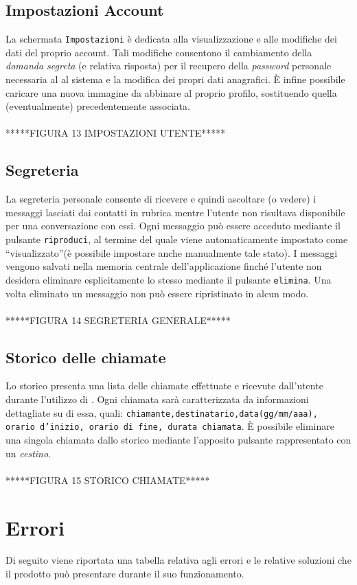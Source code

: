 \subsection{Impostazioni Account}
La schermata \texttt{Impostazioni} è dedicata alla visualizzazione e alle modifiche dei dati del proprio account. Tali modifiche consentono il cambiamento della \textit{domanda segreta} (e relativa risposta) per il recupero della \textit{password} personale necessaria al \underline{} al sistema e la modifica dei propri dati anagrafici.
È infine possibile caricare una nuova immagine da abbinare al proprio profilo, sostituendo quella (eventualmente) precedentemente associata.
\\\\*****FIGURA 13 IMPOSTAZIONI UTENTE*****
 
\subsection{Segreteria}
La segreteria personale consente di ricevere e quindi ascoltare (o vedere) i messaggi lasciati dai contatti in rubrica mentre l'utente non risultava disponibile per una conversazione con essi.
Ogni messaggio può essere acceduto mediante il pulsante \texttt{riproduci}, al termine del quale viene automaticamente impostato come ``visualizzato''(è possibile impostare anche manualmente tale stato).
I messaggi vengono salvati nella memoria centrale dell'applicazione \caName{} finché l'utente non desidera eliminare esplicitamente lo stesso mediante il pulsante \texttt{elimina}. Una volta eliminato un messaggio non può essere ripristinato in alcun modo.
\\\\*****FIGURA 14 SEGRETERIA GENERALE*****

\subsection{Storico delle chiamate}
Lo storico presenta una lista delle chiamate effettuate e ricevute dall'utente durante l'utilizzo di \caName{}. Ogni chiamata sarà caratterizzata da informazioni dettagliate su di essa, quali: \texttt{chiamante,destinatario,data(gg/mm/aaa), orario d'inizio, orario di fine, durata chiamata}.
È possibile eliminare una singola chiamata dallo storico mediante l'apposito pulsante rappresentato con un \textit{cestino}.
\\\\*****FIGURA 15 STORICO CHIAMATE*****
\section{Errori}
Di seguito viene riportata una tabella relativa agli errori e le relative soluzioni che il prodotto \caName{} può presentare durante il suo funzionamento.

